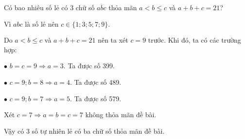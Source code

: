 \begin{bt}
	Có bao nhiêu số lẻ có 3 chữ số $\overline{abc}$ thỏa mãn $a<b\le c$ và $a+b+c=21$?
	\begin{loigiaichuong1}
		Vì $abc$ là số lẻ nên $c \in \{1; 3; 5; 7; 9\}$.
		
		Do $a < b \le c$ và $a + b + c = 21$ nên ta xét $c = 9$ trước. Khi đó, ta có các trường hợp:
		
		$\bullet$	$b = c = 9 \Rightarrow a = 3$. Ta được số 399.
		
		$\bullet$	$c = 9; b = 8 \Rightarrow a = 4$. Ta được số 489.
		
		$\bullet$	$c = 9; b = 7 \Rightarrow a = 5$. Ta được số 579.
		
		Xét $c = 7 \Rightarrow a = b = c = 7$ không thỏa mãn đề bài.
		
		Vậy có 3 số tự nhiên lẻ có ba chữ số thỏa mãn đề bài.
	\end{loigiaichuong1}
\end{bt}

